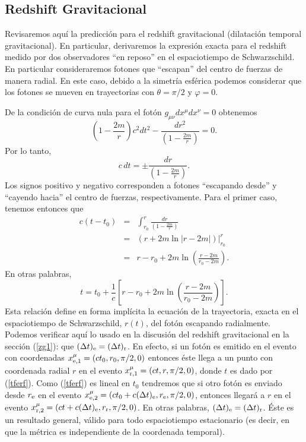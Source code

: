 \subsection{Redshift Gravitacional}\label{sec:redshift}
Revisaremos aquí la predicción para el redshift gravitacional (dilatación temporal gravitacional). En particular, derivaremos la expresión exacta para el redshift medido por dos observadores ``en reposo'' en el espaciotiempo de Schwarzschild. En particular consideraremos fotones que ``escapan'' del centro de fuerzas de manera radial. En este caso, debido a la simetría esférica podemos considerar que los fotones se mueven en trayectorias con $\theta=\pi/2$ y $\varphi=0$.

De la condición de curva nula para el fotón $g_{\mu\nu}dx^\mu dx^\nu=0$ obtenemos
\begin{equation}
 \left(1-\frac{2m}{r}\right)c^2dt^2-\frac{dr^2}{ \left(1-\frac{2m}{r}\right)}=0.
\end{equation}
Por lo tanto,
\begin{equation}
 c\,dt=\pm\frac{dr}{ \left(1-\frac{2m}{r}\right)}.
\end{equation}
Los signos positivo y negativo corresponden a fotones ``escapando desde'' y ``cayendo hacia'' el centro de fuerzas, respectivamente. Para el primer caso, tenemos entonces que
\begin{eqnarray}
 c(t-t_0)&=&\int^r_{r_0}\frac{dr}{\left(1-\frac{2m}{r}\right)} \\
&=&\left.\left(r+2m\ln|r-2m|\right)\right|^r_{r_0} \\
&=&r-r_0+2m\ln\left(\frac{r-2m}{r_0-2m}\right).
\end{eqnarray}
En otras palabras,
\begin{equation} \label{tferf}
 t=t_0+\frac{1}{c}\left[r-r_0+2m\ln\left(\frac{r-2m}{r_0-2m}\right)\right].
\end{equation}
Esta relación define en forma implícita la ecuación de la trayectoria, exacta en el espaciotiempo de Schwarzschild, $r(t)$, del fotón escapando radialmente. Podemos verificar  aquí lo usado en la discusión del redshift gravitacional en la sección (\ref{zg1}): que $(\Delta t)_{\rm e}=(\Delta t)_{\rm r}$. En efecto, si un fotón es emitido en el evento con coordenadas $x^\mu_{{\rm e},1}=(ct_0,r_0,\pi/2,0)$ entonces éste llega a un punto con coordenada radial $r$ en el evento $x^\mu_{{\rm r},1}=(ct,r,\pi/2,0)$, donde $t$ es dado por (\ref{tferf}). Como (\ref{tferf}) es lineal en $t_0$ tendremos que si otro fotón es enviado desde $r_{\rm e}$ en el evento $x^\mu_{{\rm e},2}=(ct_0+c(\Delta t)_{\rm e},r_{\rm e},\pi/2,0)$, entonces llegará a $r$ en el evento $x^\mu_{{\rm r},2}=(ct+c(\Delta t)_{\rm e},r_{\rm r},\pi/2,0)$. En otras palabras, $(\Delta t)_{\rm e}=(\Delta t)_{\rm r}$. Éste es un resultado general, válido para todo espaciotiempo estacionario (es decir, en que la métrica es independiente de la coordenada temporal).

